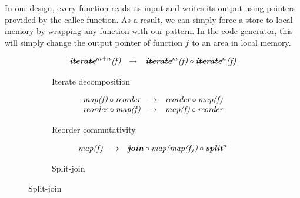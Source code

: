 In our design, every function reads its input and writes its output using pointers provided by the callee function.
As a result, we can simply force a store to local memory by wrapping any function with our  pattern.
In the code generator, this will simply change the output pointer of function $f$ to an area in local memory.

\setlength{\ruleSpace}{-1em}
\begin{figure}[t]
\centering

\begin{subfigure}[b]{1\linewidth}
\begin{mdframed}
$$
\begin{array}{lrl}
  \textit{\textbf{iterate}}^{m+n}\textit{(f)} & \rightarrow & \textit{\textbf{iterate}}^m\textit{(f)} \circ \textit{\textbf{iterate}}^n\textit{(f)}\\
  \end{array}
$$
\end{mdframed}
  \caption{Iterate decomposition}
  \label{fig:algo:iterate}
\end{subfigure}

\vspace{\ruleSpace}
\begin{subfigure}[b]{1\linewidth}
\begin{mdframed}
$$
\begin{array}{lrl}
  \textit{map(f)} \circ \textit{reorder} & \rightarrow & \textit{reorder} \circ \textit{map(f)}\\
  \textit{reorder} \circ \textit{map(f)} & \rightarrow & \textit{map(f)} \circ \textit{reorder}\\  
\end{array}
$$
\end{mdframed}
  \caption{Reorder commutativity}
  \label{fig:algo:reorder}
\end{subfigure}

\vspace{\ruleSpace}
\begin{subfigure}[b]{1\linewidth}
\begin{mdframed}
$$
\begin{array}{lrl}
  \textit{map(f)} & \rightarrow & \textit{\textbf{join}} \circ \textit{map(map(f))}\circ \textit{\textbf{split}}^n
\end{array}
$$
\end{mdframed}
  \caption{Split-join}
  \label{fig:algo:splitjoin}
\end{subfigure}


\end{figure}
